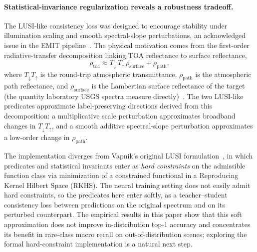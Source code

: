 \documentclass[11pt]{article}
\begin{document}
\paragraph{Statistical-invariance regularization reveals a robustness tradeoff.}
The LUSI-like consistency loss was designed to encourage stability under illumination scaling and smooth spectral-slope perturbations, an acknowledged issue in the EMIT pipeline~\cite{emit_l2a_atbd, emit_l2b_atbd}.
The physical motivation comes from the first-order radiative-transfer decomposition linking TOA reflectance to surface reflectance,
\begin{equation}
\rho_{\text{toa}} \approx T_{\downarrow}\,T_{\uparrow}\,\rho_{\text{surface}} + \rho_{\text{path}},
\label{eq:toa_decomp_disc}
\end{equation}
where $T_{\downarrow}T_{\uparrow}$ is the round-trip atmospheric transmittance, $\rho_{\text{path}}$ is the atmospheric path reflectance, and $\rho_{\text{surface}}$ is the Lambertian surface reflectance of the target (the quantity laboratory USGS spectra measure directly)~\cite{vermote1997sixs}.
The two LUSI-like predicates approximate label-preserving directions derived from this decomposition: a multiplicative scale perturbation approximates broadband changes in $T_{\downarrow}T_{\uparrow}$, and a smooth additive spectral-slope perturbation approximates a low-order change in $\rho_{\text{path}}$.

The implementation diverges from Vapnik's original LUSI formulation~\cite{vapnik2020}, in which predicates and statistical invariants enter as \emph{hard constraints} on the admissible function class via minimization of a constrained functional in a Reproducing Kernel Hilbert Space (RKHS).
The neural training setting does not easily admit hard constraints, so the predicates here enter softly, as a teacher--student consistency loss between predictions on the original spectrum and on its perturbed counterpart.
The empirical results in this paper show that this soft approximation does not improve in-distribution top-1 accuracy and concentrates its benefit in rare-class macro recall on out-of-distribution scenes; exploring the formal hard-constraint implementation is a natural next step.
\end{document}
